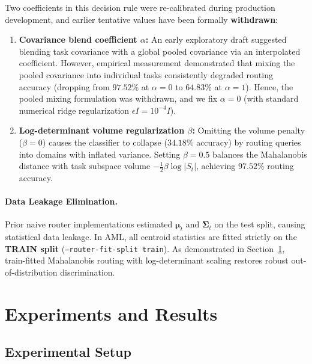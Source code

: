 \documentclass[11pt, a4paper]{article}
\begin{document}
Two coefficients in this decision rule were re-calibrated during production development, and earlier tentative values have been formally \textbf{withdrawn}:
\begin{enumerate}
    \item \textbf{Covariance blend coefficient $\alpha$:} An early exploratory draft suggested blending task covariance with a global pooled covariance via an interpolated coefficient. However, empirical measurement demonstrated that mixing the pooled covariance into individual tasks consistently degraded routing accuracy (dropping from $97.52\%$ at $\alpha=0$ to $64.83\%$ at $\alpha=1$). Hence, the pooled mixing formulation was withdrawn, and we fix $\alpha = 0$ (with standard numerical ridge regularization $\epsilon I = 10^{-4}I$).
    \item \textbf{Log-determinant volume regularization $\beta$:} Omitting the volume penalty ($\beta = 0$) causes the classifier to collapse ($34.18\%$ accuracy) by routing queries into domains with inflated variance. Setting $\beta = 0.5$ balances the Mahalanobis distance with task subspace volume $-\frac{1}{2}\beta \log|S_t|$, achieving $97.52\%$ routing accuracy.
\end{enumerate}

\paragraph{Data Leakage Elimination.}
Prior naive router implementations estimated $\boldsymbol{\mu}_t$ and $\boldsymbol{\Sigma}_t$ on the test split, causing statistical data leakage. In AML, all centroid statistics are fitted strictly on the \textbf{TRAIN split} (\texttt{--router-fit-split train}). As demonstrated in Section~\ref{sec:experiments}, train-fitted Mahalanobis routing with log-determinant scaling restores robust out-of-distribution discrimination.

\section{Experiments and Results}
\label{sec:experiments}

\subsection{Experimental Setup}
\end{document}
